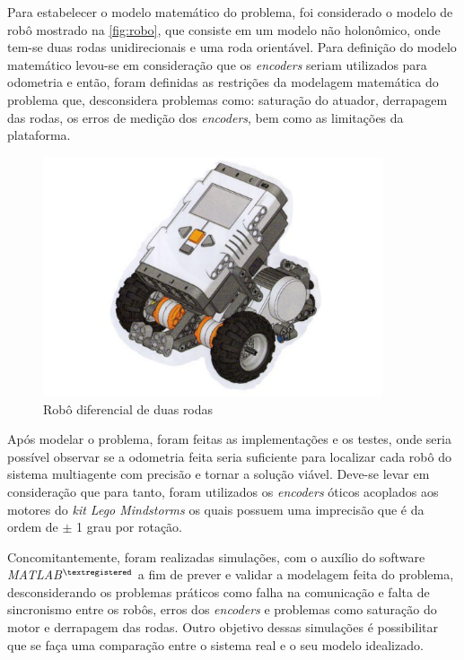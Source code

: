 Para estabelecer o modelo matemático do problema, foi considerado o modelo de robô mostrado na \autoref{fig:robo}, que consiste em um modelo não holonômico, onde tem-se duas rodas unidirecionais e uma roda orientável. Para definição do modelo matemático levou-se em consideração que os \emph{encoders} seriam utilizados para odometria e então, foram definidas as restrições da modelagem matemática do problema que, desconsidera problemas como: saturação do atuador, derrapagem das rodas, os erros de medição dos \emph{encoders}, bem como as limitações da plataforma. %

\begin{figure}[!htb]
	\centering
	\includegraphics[width=10cm]{./04-figuras/robo}
	\caption{Robô diferencial de duas rodas}
	\label{fig:robo}
\end{figure}

Após modelar o problema, foram feitas as implementações e os testes, onde seria possível observar se a odometria feita seria suficiente para localizar cada robô do sistema multiagente com precisão e tornar a solução viável. Deve-se levar em consideração que para tanto, foram utilizados os \emph{encoders} óticos acoplados aos motores do \emph{kit Lego Mindstorms\textregistered} os quais possuem uma imprecisão que é da ordem de $\pm$ 1 grau por rotação. 

Concomitantemente, foram realizadas simulações, com o auxílio do software \emph{MATLAB$^{\textregistered}$} a fim de prever e validar a modelagem feita do problema, desconsiderando os problemas práticos como falha na comunicação e falta de sincronismo entre os robôs, erros dos \emph{encoders} e problemas como saturação do motor e derrapagem das rodas. Outro objetivo dessas simulações é possibilitar que se faça uma comparação entre o sistema real e o seu modelo idealizado.

